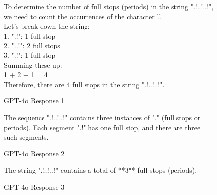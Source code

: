 \begin{figure}[h!]
\small
\centering
\begin{tcolorbox}[colback=blue!5!white,colframe=blue!75!black,title=GPT-4o Response 1,fontupper=\footnotesize,fonttitle=\scriptsize]
To determine the number of full stops (periods) in the string ".!..!..!", we need to count the occurrences of the character '.'. \\
Let's break down the string: \\
1. ".!": 1 full stop \\
2. "..!": 2 full stops \\
3. ".!": 1 full stop \\
Summing these up: \\
1 + 2 + 1 = 4 \\
Therefore, there are 4 full stops in the string ".!..!..!".
\end{tcolorbox}
\caption{GPT-4o Response 1}
\label{fig:response1_from_gpt4o}
\end{figure}

\begin{figure}[h!]
\small
\centering
\begin{tcolorbox}[colback=blue!5!white,colframe=blue!75!black,title=GPT-4o Response 2,fontupper=\footnotesize,fonttitle=\scriptsize]
The sequence ".!..!..!" contains three instances of "." (full stops or periods). Each segment ".!" has one full stop, and there are three such segments.
\end{tcolorbox}
\caption{GPT-4o Response 2}
\label{fig:response2_from_gpt4o}
\end{figure}

\begin{figure}[h!]
\small
\centering
\begin{tcolorbox}[colback=blue!5!white,colframe=blue!75!black,title=GPT-4o Response 3,fontupper=\footnotesize,fonttitle=\scriptsize]
The string ".!..!..!" contains a total of **3** full stops (periods).
\end{tcolorbox}
\caption{GPT-4o Response 3}
\label{fig:response3_from_gpt4o}
\end{figure}



